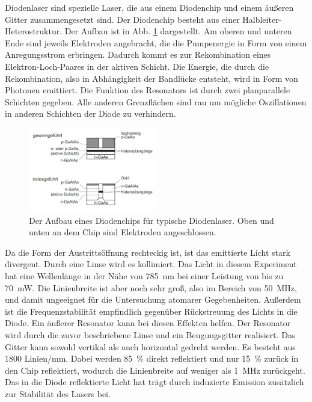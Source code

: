 Diodenlaser sind spezielle Laser, die aus einem Diodenchip und einem äußeren Gitter zusammengesetzt sind. 
Der Diodenchip besteht aus einer Halbleiter-Heterostruktur. Der Aufbau ist in Abb. \ref{abb:chip} dargestellt. Am oberen und unteren Ende sind jeweils Elektroden angebracht, die die Pumpenergie in Form von einem Anregungsstrom erbringen. Dadurch kommt es zur Rekombination eines Elektron-Loch-Paares in der aktiven Schicht. Die Energie, die durch die Rekombination, also in Abhängigkeit der Bandlücke entsteht, wird in Form von Photonen emittiert. Die Funktion des Resonators ist durch zwei planparallele Schichten gegeben. Alle anderen Grenzflächen sind rau um mögliche Oszillationen in anderen Schichten der Diode zu verhindern.  

\begin{figure}
    \centering
    \includegraphics[width=0.5\textwidth]{pics/chip.jpg}
    \caption{Der Aufbau eines Diodenchips für typische Diodenlaser. Oben und unten an dem Chip sind Elektroden angeschlossen. \cite{eichler}}
    \label{abb:chip}
\end{figure}


Da die Form der Austrittsöffnung rechteckig ist, ist das emittierte Licht stark divergent. Durch eine Linse wird es kollimiert. Das Licht in diesem Experiment hat eine Wellenlänge in der Nähe von \SI{785}{\nm} bei einer Leistung von bis zu \SI{70}{\mW}. Die Linienbreite ist aber noch sehr groß, also im Bereich von \SI{50}{\MHz}, und damit ungeeignet für die Untersuchung atomarer Gegebenheiten. Außerdem ist die Frequenzstabilität empfindlich gegenüber Rückstreuung des Lichts in die Diode. Ein äußerer Resonator kann bei diesen Effekten helfen.
Der Resonator wird durch die zuvor beschriebene Linse und ein Beugungsgitter realisiert. Das Gitter kann sowohl vertikal als auch horizontal gedreht werden. Es besteht aus \num{1800} Linien$/$\si{\milli\metre}. Dabei werden \SI{85}{\percent} direkt reflektiert und nur \SI{15}{\percent} zurück in den Chip reflektiert, wodurch die Linienbreite auf weniger als \SI{1}{\MHz} zurückgeht. Das in die Diode reflektierte Licht hat trägt durch induzierte Emission zusätzlich zur Stabilität des Lasers bei. \cite{anleitung}


